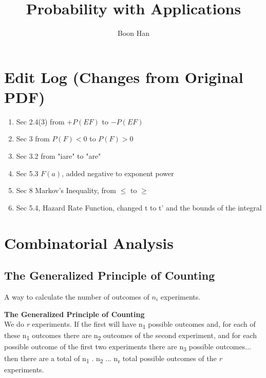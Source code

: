 \documentclass[10pt,a4paper]{article}
\author{Boon Han}
\title{Probability with Applications}
\begin{document}
    \maketitle
    \tableofcontents
    \newpage
    \section*{Edit Log (Changes from Original PDF)} %
    \label{sec:edit_log}
    \begin{enumerate}
      \item Sec 2.4(3) from $+ P(EF)$ to $- P(EF)$
      \item Sec 3 from $P(F) < 0$ to $P(F) > 0$
      \item Sec 3.2 from "iare" to "are"
      \item Sec 5.3 $F(a)$, added negative to exponent power
      \item Sec 8 Markov's Inequality, from $\leq$ to $\geq$
      \item Sec 5.4, Hazard Rate Function, changed t to t' and the bounds of the integral
    \end{enumerate}
    \newpage
    \section{Combinatorial Analysis}
        \subsection{The Generalized Principle of Counting}
        A way to calculate the number of outcomes of $n_{i}$ experiments.
           \begin{framed}
               \center \textbf {The Generalized Principle of Counting} \\
               We do \emph{r} experiments. If the first will have n{\textsubscript{1}} possible outcomes and, for each of these n{\textsubscript{1}} outcomes there are n{\textsubscript{2}} outcomes of the second experiment, and for each possible outcome of the first two experiments there are n{\textsubscript{3}} possible outcomes... then there are a total of n{\textsubscript{1}} . n{\textsubscript{2}} ... n{\textsubscript{r}} total possible outcomes of the \emph{r} experiments.
           \end{framed}
\end{document}
